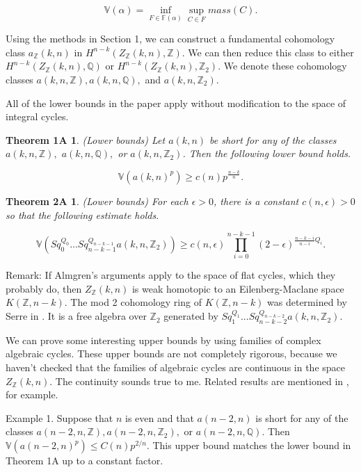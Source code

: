 \documentclass{amsart}
\newtheorem*{Theorem 1}{Theorem 1}
\newtheorem*{Theorem 2}{Theorem 2}
\newtheorem*{Theorem 1A}{Theorem 1A}
\newtheorem*{Theorem 2A}{Theorem 2A}
\newtheorem*{vanishing lemma}{Vanishing Lemma}
\numberwithin{equation}{section}
\begin{document}
$$\mathbb{V}(\alpha) = \inf_{F \in \mathbb{F}(\alpha)} \sup_{C
\in F} mass(C).$$

Using the methods in Section 1, we can construct a fundamental
cohomology class $a_{\mathbb{Z}}(k,n)$ in
$H^{n-k}(Z_{\mathbb{Z}}(k,n), \mathbb{Z})$.  We can then reduce
this class to either $H^{n-k}(Z_{\mathbb{Z}}(k,n), \mathbb{Q})$
or $H^{n-k}(Z_{\mathbb{Z}}(k,n), \mathbb{Z}_2)$.  We denote these
cohomology classes $a(k,n, \mathbb{Z}), a(k,n, \mathbb{Q}),$ and
$a(k,n, \mathbb{Z}_2)$.

All of the lower bounds in the paper apply without modification
to the space of integral cycles.

\begin{Theorem 1A} (Lower bounds) Let $a(k,n)$ be short for any
of the classes $a(k,n, \mathbb{Z}),$ $a(k,n, \mathbb{Q}),
$ or $a(k,n, \mathbb{Z}_2)$.  Then the following lower bound holds.

$$\mathbb{V}(a(k,n)^p) \ge c(n) p^{\frac{n-k}{n}}.$$

\end{Theorem 1A}

\begin{Theorem 2A} (Lower bounds) For each $\epsilon > 0$, there is a constant
$c(n, \epsilon) > 0$ so that the following estimate holds.

$$\mathbb{V}(Sq_0^{Q_0} ... Sq_{n-k-1}^{Q_{n-k-1}} a(k,n,
\mathbb{Z}_2)) \ge c(n, \epsilon) \prod_{i=0}^{n-k-1} (2 -
\epsilon)^{\frac{n-k-i}{n-i} Q_i} .$$

\end{Theorem 2A}

Remark: If Almgren's arguments apply to the space of flat cycles,
which they probably do, then $Z_{\mathbb{Z}}(k,n)$ is weak
homotopic to an Eilenberg-Maclane space $K(\mathbb{Z}, n-k)$. 
The mod 2 cohomology ring of $K(\mathbb{Z}, n-k)$
was determined by Serre in \cite{S}.  It is a free algebra over
$\mathbb{Z}_2$ generated by $Sq_1^{Q_1} ... Sq_{n-k-2}^{Q_{n-k-2}} a(k,n,
\mathbb{Z}_2)$.

We can prove some interesting upper bounds by using families of
complex algebraic cycles.  These upper bounds are not completely
rigorous, because we haven't checked that the families of
algebraic cycles are continuous in the space
$Z_{\mathbb{Z}}(k,n)$.  The continuity sounds true to me. 
Related results are mentioned in \cite{L}, for example.

Example 1. Suppose that $n$ is even and that $a(n-2,n)$ is short
for any of the classes $a(n-2,n, \mathbb{Z}), a(n-2,n,
\mathbb{Z}_2),$ or $a(n-2,n, \mathbb{Q})$.  Then
$\mathbb{V}(a(n-2,n)^p) \le C(n) p^{2/n}$.  This upper bound
matches the lower bound in Theorem 1A up to a constant factor.
\end{document}
